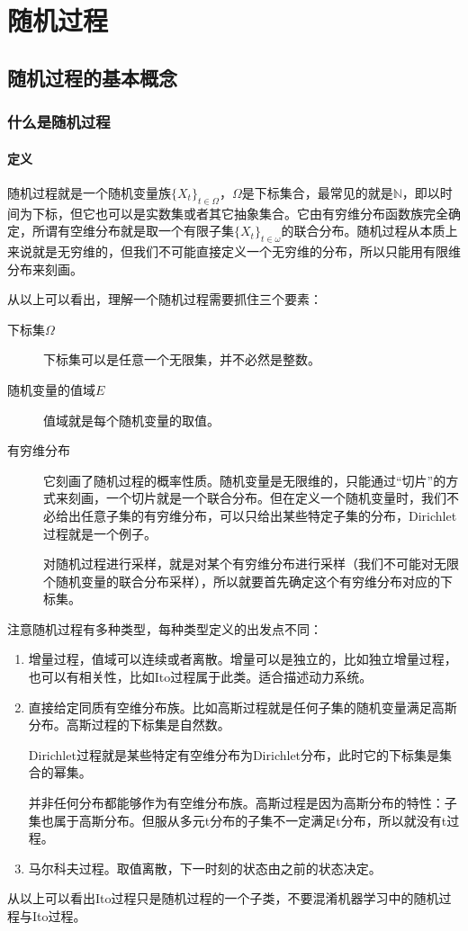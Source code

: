 \section{随机过程}
\subsection{随机过程的基本概念}

\subsubsection{什么是随机过程}
\paragraph*{定义}
随机过程就是一个随机变量族$\{X_t\}_{t\in\Omega}$，$\Omega$是下标集合，最常见的就是$\mathbb{N}$，即以时间为下标，但它也可以是实数集或者其它抽象集合。它由有穷维分布函数族完全确定，所谓有空维分布就是取一个有限子集$\{X_t\}_{t\in\omega}$的联合分布。随机过程从本质上来说就是无穷维的，但我们不可能直接定义一个无穷维的分布，所以只能用有限维分布来刻画。

从以上可以看出，理解一个随机过程需要抓住三个要素：
\begin{description}
	\item[下标集$\Omega$] 下标集可以是任意一个无限集，并不必然是整数。
	\item[随机变量的值域$E$] 值域就是每个随机变量的取值。
	\item[有穷维分布] 它刻画了随机过程的概率性质。随机变量是无限维的，只能通过“切片”的方式来刻画，一个切片就是一个联合分布。但在定义一个随机变量时，我们不必给出任意子集的有穷维分布，可以只给出某些特定子集的分布，Dirichlet过程就是一个例子。
	
	对随机过程进行采样，就是对某个有穷维分布进行采样（我们不可能对无限个随机变量的联合分布采样），所以就要首先确定这个有穷维分布对应的下标集。
\end{description}

注意随机过程有多种类型，每种类型定义的出发点不同：
\begin{enumerate}
\item 增量过程，值域可以连续或者离散。增量可以是独立的，比如独立增量过程，也可以有相关性，比如Ito过程属于此类。适合描述动力系统。
\item 直接给定同质有空维分布族。比如高斯过程就是任何子集的随机变量满足高斯分布。高斯过程的下标集是自然数。

Dirichlet过程就是某些特定有空维分布为Dirichlet分布，此时它的下标集是集合的幂集。

并非任何分布都能够作为有空维分布族。高斯过程是因为高斯分布的特性：子集也属于高斯分布。但服从多元t分布的子集不一定满足t分布，所以就没有t过程。
\item 马尔科夫过程。取值离散，下一时刻的状态由之前的状态决定。
\end{enumerate}
从以上可以看出Ito过程只是随机过程的一个子类，不要混淆机器学习中的随机过程与Ito过程。

